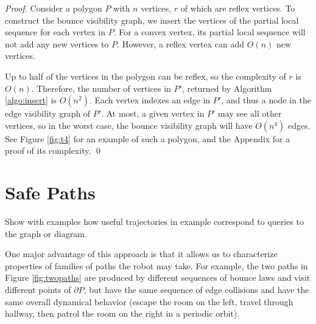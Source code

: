 \documentclass[]{styles/svproc}  %
\begin{document}
\begin{proof}

Consider a polygon $P$ with $n$ vertices, $r$ of which are reflex vertices. To
construct the bounce visibility graph, we insert the vertices of the partial
local sequence for each vertex in $P$. For a convex vertex, its partial local sequence 
will not add any new vertices to $P$. However, a reflex vertex can add $O(n)$ new vertices. 

Up to half of the vertices in the polygon can be reflex, so the complexity of
$r$ is $O(n)$. Therefore, the number of vertices in $P'$, returned by Algorithm
\ref{algo:insert} is $O(n^2)$. Each vertex indexes an edge in $P'$, and
thus a node in the edge visibility graph of $P'$. At most, a given vertex in $P'$ may see all other vertices, so in the worst
case, the bounce visibility graph will have $O(n^4)$ edges. See Figure
\ref{fig:t4} for an example of such a polygon, and the Appendix for a proof of
its complexity.
\qed

\end{proof}



%
%

\section{Safe Paths} \label{sec:safe}

{\color{red}
Show with examples how useful trajectories in example correspond to queries to
the graph or diagram.}

One major advantage of this approach is that it allows us to characterize
properties of families of paths the robot may take. For example, the  
two paths in Figure \ref{fig:twopaths} are produced by different sequences of
bounce laws and visit different points of $\partial P$, but have the same sequence of edge collisions and have the same overall
dynamical behavior (escape the room on the left, travel through hallway, then
patrol the room on the right in a periodic orbit).
\end{document}
